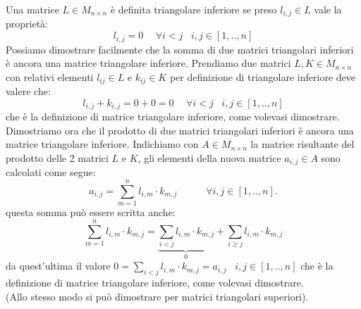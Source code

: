 \begin{flushleft}
Una matrice $L\in M_{n\times n}$ è definita triangolare inferiore se preso $l_{i,j} \in L$ vale la proprietà: 
\[
l_{i,j}=0 \hspace{15pt} \forall i<j \hspace{10pt} i,j \in [1,..,n] 
\]
Possiamo dimostrare facilmente che la somma di due matrici triangolari inferiori è ancora una matrice triangolare inferiore. Prendiamo due matrici $L,K \in M_{n \times n}$ con relativi elementi $l_{ij} \in L$ e $k_{ij} \in K$ per definizione di triangolare inferiore deve valere che:
\[
l_{i,j} + k_{i,j} = 0 + 0 = 0 \hspace{15pt} \forall i<j \hspace{10pt} i,j \in [1,..,n] 
\]
che è la definizione di matrice triangolare inferiore, come volevasi dimostrare. Dimostriamo ora che il prodotto di due matrici triangolari inferiori è ancora una matrice triangolare inferiore. Indichiamo con $A \in M_{n \times n}$ la matrice risultante del prodotto delle 2 matrici $L$ e $K$, gli elementi della nuova matrice $a_{i,j} \in A$ sono calcolati come segue:
\[
a_{i,j} = \sum_{m=1}^n l_{i,m} \cdot k_{m,j} \hspace{35pt} \forall i,j \in [1,..,n].
\]
questa somma può essere scritta anche:
\[
\sum_{m=1}^n l_{i,m} \cdot k_{m,j} =  \underbrace{ \sum_{i<j} l_{i,m} \cdot k_{m,j} }_{0}  + \sum_{i\geq j} l_{i,m}\cdot k_{m,j}
\]
da quest'ultima il valore $0 =\sum_{i<j} l_{i,m} \cdot k_{m,j} = a_{i,j} \hspace{10pt} i,j \in [1,..,n]$ che è la definizione di matrice triangolare inferiore, come volevasi dimostrare. \\

(Allo stesso modo si può dimostrare per matrici triangolari superiori).
\end{flushleft}